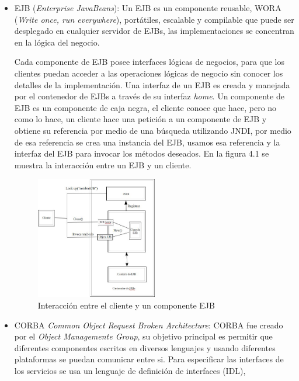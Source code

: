 \documentclass[12pt,a4paper,spanish,openany]{book}
\begin{document}
\begin{itemize}
  \item EJB (\emph{Enterprise JavaBeans}): Un EJB es un componente reusable,
  WORA (\emph{Write once, run everywhere}), portátiles, escalable y compilable que puede ser desplegado en
  cualquier servidor de EJBs, las implementaciones se concentran en la lógica
  del negocio.
  
  
  Cada componente de EJB posee interfaces lógicas de negocios, para
  que los clientes puedan acceder a las operaciones lógicas de negocio sin
  conocer los detalles de la implementación. Una interfaz de un EJB es creada y
  manejada por el contenedor de EJBs a través de su interfaz
  \emph{home}. Un componente de EJB es un componente de caja negra, el cliente conoce que hace,
  pero no como lo hace, un cliente hace una petición a un componente de EJB y
  obtiene su referencia por medio de una búsqueda utilizando \gls{JNDI},
  por medio de esa referencia se crea una instancia del EJB, usamos esa
  referencia y la interfaz del EJB  para invocar los métodos deseados.
  En la figura 4.1 se muestra la interacción entre un EJB y un cliente.
  
  
\begin{figure}
\begin{center}
\includegraphics[width=0.5\textwidth]{./img/ejb.jpg}
\caption{Interacción entre el cliente y un componente EJB}
\end{center}
\end{figure}


\item CORBA \emph{Common Object Request Broken Architecture}: CORBA fue creado
por el \emph{Object Managemente Group}, su objetivo principal es permitir que
diferentes componentes escritos en diversos lenguajes y usando diferentes
plataformas se puedan comunicar entre si. Para especificar las interfaces de
los servicios se usa un lenguaje de definición de interfaces (IDL),


\end{itemize}
\end{document}
